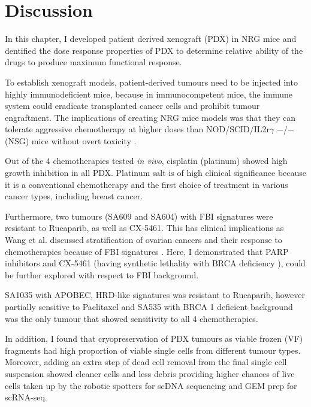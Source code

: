 \section{Discussion}


 In this chapter, I developed patient derived xenograft (PDX) in NRG mice and dentified the dose response properties of PDX to determine relative ability of the drugs to produce maximum functional response. 

  To establish xenograft models, patient-derived tumours need to be injected into highly immunodeficient mice, because in immunocompetent mice, the immune system could eradicate transplanted cancer cells and prohibit tumour engraftment. The implications of creating \ac{NRG} mice models was that they can tolerate aggressive chemotherapy at higher doses than NOD/SCID/IL2r$\gamma$ $-$/$-$ (NSG) mice without overt toxicity \cite{barve2018comparative}. 


 Out of the 4 chemotherapies tested \textit{in vivo}, cisplatin (platinum) showed high growth inhibition in all PDX. Platinum salt is of high clinical significance because it is a conventional chemotherapy and the first choice of treatment in various cancer types, including breast cancer.
 
 Furthermore, two tumours (SA609 and SA604) with FBI signatures were resistant to Rucaparib, as well as CX-5461. This has clinical implications as Wang et al. discussed stratification of ovarian cancers and their response to chemotherapies because of FBI signatures  \cite{wang2017genomic}. Here, I demonstrated that PARP inhibitors and CX-5461 (having synthetic lethality with BRCA deficiency \cite{xu2017cx}), could be further explored with respect to FBI background.

SA1035 with APOBEC, HRD-like signatures was resistant to Rucaparib, however partially sensitive to Paclitaxel and SA535 with BRCA 1 deficient background was the only tumour that showed sensitivity to all 4 chemotherapies.
 

 In addition, I found that cryopreservation of PDX tumours as viable frozen (VF) fragments had high proportion of viable single cells from different tumour types. Moreover, adding an extra step of dead cell removal from the final single cell suspension showed cleaner cells and less debris providing higher chances of live cells taken up by the robotic spotters for scDNA sequencing and GEM prep for scRNA-seq.

